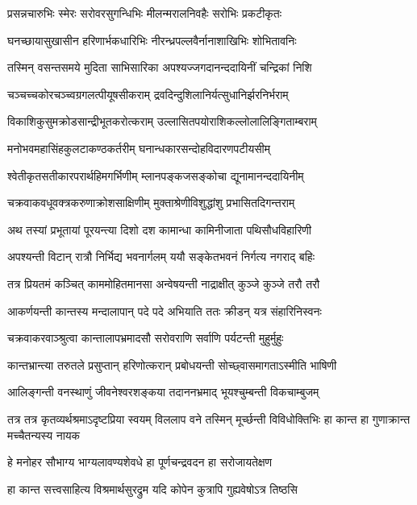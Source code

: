 \twolineshloka
{प्रसन्नचारुभिः स्मेरः सरोवरसुगन्धिभिः}
{मीलन्मरालनिवहैः सरोभिः प्रकटीकृतः} %

\twolineshloka
{घनच्छायासुखासीन हरिणार्भकधारिभिः}
{नीरन्ध्रपल्लवैर्नानाशाखिभिः शोभितावनिः} %

\twolineshloka
{तस्मिन् वसन्तसमये मुदिता साभिसारिका}
{अपश्यज्जगदानन्ददायिनीं चन्द्रिकां निशि} %

\twolineshloka
{चञ्चच्चकोरचञ्च्वग्रगलत्पीयूषसीकराम्}
{द्रवदिन्दुशिलानिर्यत्सुधानिर्झरनिर्भराम्} %

\twolineshloka
{विकाशिकुसुमक्रोडसान्द्रीभूतकरोत्कराम्}
{उल्लासितपयोराशिकल्लोलालिङ्गिताम्बराम्} %

\twolineshloka
{मनोभवमहासिंहकुलटाकण्ठकर्तरीम्}
{घनान्धकारसन्दोहविदारणपटीयसीम्} %

\twolineshloka
{श्वेतीकृतसतीकारपरार्थहिमगर्भिणीम्}
{म्लानपङ्कजसङ्कोचा द्यूनामानन्ददायिनीम्} %

\twolineshloka
{चक्रवाकवधूवक्त्रकरुणाक्रोशसाक्षिणीम्}
{मुक्ताश्रेणीविशुद्धांशु प्रभासितदिगन्तराम्} %

\twolineshloka
{अथ तस्यां प्रभूतायां पूरयन्त्या दिशो दश}
{कामान्धा कामिनीजाता पथिसौधविहारिणी} %

\twolineshloka
{अपश्यन्ती विटान् रात्रौ निर्भिद्य भवनार्गलम्}
{ययौ सङ्केतभवनं निर्गत्य नगराद् बहिः} %

\twolineshloka
{तत्र प्रियतमं कञ्चित् काममोहितमानसा}
{अन्वेषयन्ती नाद्राक्षीत् कुञ्जे कुञ्जे तरौ तरौ} %

\twolineshloka
{आकर्णयन्ती कान्तस्य मन्दालापान् पदे पदे}
{अभियाति ततः क्रीडन् यत्र संहारिनिस्वनः} %

\twolineshloka
{चक्रवाकरवाञ्श्रुत्वा कान्तालापभ्रमादसौ}
{सरोवराणि सर्वाणि पर्यटन्ती मुहुर्मुहुः} %

\twolineshloka
{कान्तभ्रान्त्या तरुतले प्रसुप्तान् हरिणोत्करान्}
{प्रबोधयन्ती सोच्छ्वासमागताऽस्मीति भाषिणी} %

\twolineshloka
{आलिङ्गन्ती वनस्थाणुं जीवनेश्वरशङ्कया}
{तदाननभ्रमाद् भूयश्चुम्बन्ती विकचाम्बुजम्} %

\threelineshloka
{तत्र तत्र कृतव्यर्थश्रमाऽदृष्टप्रिया स्वयम्}
{विललाप वने तस्मिन् मूर्च्छन्ती विविधोक्तिभिः}
{हा कान्त हा गुणाक्रान्त मच्चैतन्यस्य नायक} %

\twolineshloka
{हे मनोहर सौभाग्य भाग्यलावण्यशेवधे}
{हा पूर्णचन्द्रवदन हा सरोजायतेक्षण} %

\twolineshloka
{हा कान्त सत्त्वसाहित्य विश्रमार्थसुरद्रुम}
{यदि कोपेन कुत्रापि गुह्यवेषोऽत्र तिष्ठसि} %


